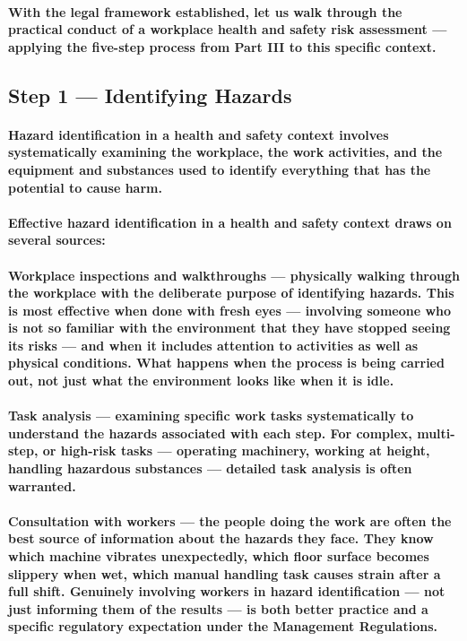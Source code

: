 \paragraph{With the legal framework established, let us walk through the practical conduct of a workplace health and safety risk assessment — applying the five-step process from Part III to this specific context.}
\subsection{Step 1 — Identifying Hazards}
\paragraph{Hazard identification in a health and safety context involves systematically examining the workplace, the work activities, and the equipment and substances used to identify everything that has the potential to cause harm.}
\paragraph{Effective hazard identification in a health and safety context draws on several sources:}
\paragraph{\textbf{Workplace inspections and walkthroughs} — physically walking through the workplace with the deliberate purpose of identifying hazards. This is most effective when done with fresh eyes — involving someone who is not so familiar with the environment that they have stopped seeing its risks — and when it includes attention to activities as well as physical conditions. What happens when the process is being carried out, not just what the environment looks like when it is idle.}
\paragraph{\textbf{Task analysis} — examining specific work tasks systematically to understand the hazards associated with each step. For complex, multi-step, or high-risk tasks — operating machinery, working at height, handling hazardous substances — detailed task analysis is often warranted.}
\paragraph{\textbf{Consultation with workers} — the people doing the work are often the best source of information about the hazards they face. They know which machine vibrates unexpectedly, which floor surface becomes slippery when wet, which manual handling task causes strain after a full shift. Genuinely involving workers in hazard identification — not just informing them of the results — is both better practice and a specific regulatory expectation under the Management Regulations.}
